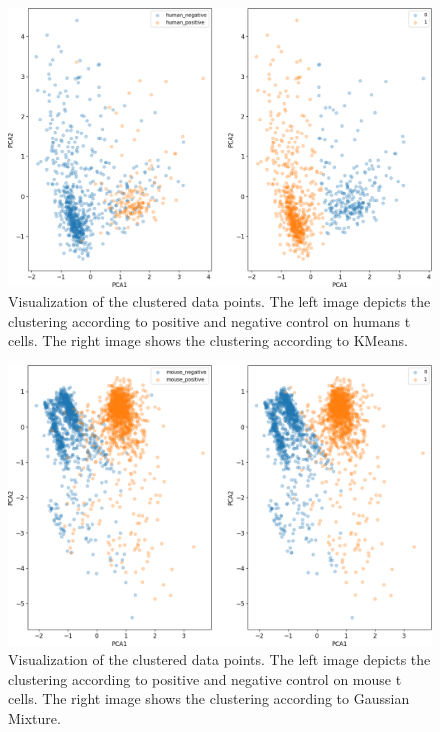 	
\begin{figure}
	\centering
	\includegraphics[width=\textwidth]{fig/separate_human_kmeans}
	
	\caption{Visualization of the clustered data points. The left image depicts the clustering according to positive and negative control on humans t cells. The right image shows the clustering according to KMeans.}
	\label{fig:vis_output_seperate_human_kmeans}
\end{figure}

\begin{figure}
	\centering
	\includegraphics[width=\textwidth]{fig/separate_mouse_gaussian_mixture}
	
	\caption{Visualization of the clustered data points. The left image depicts the clustering according to positive and negative control on mouse t cells. The right image shows the clustering according to Gaussian Mixture.}
	\label{fig:vis_output_seperate_mouse_gaussian_mixture}
\end{figure}


